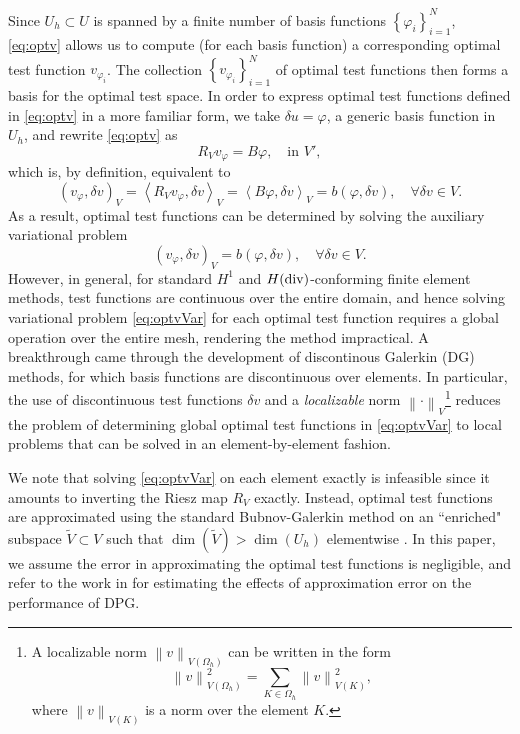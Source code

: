 \documentclass[11pt,onecolumn]{scrartcl}
\newcommand{\eqnlab}[1]{\label{eq:#1}}
\newcommand{\eqnref}[1]{\eqref{eq:#1}}
\newcommand{\nor}[1]{\left\| #1 \right\|}
\newcommand{\LRp}[1]{\left( #1 \right)}
\newcommand{\LRa}[1]{\left\langle #1 \right\rangle}
\newcommand{\LRc}[1]{\left\{ #1 \right\}}
\newcommand{\Oh}{\Omega_h}
\begin{document}
Since $U_h \subset U$ is spanned by a finite number of basis functions $\LRc{\varphi_i}_{i=1}^N$, \eqnref{optv} allows us to compute (for each basis function) a corresponding optimal test function $v_{\varphi_i}$. The collection $\LRc{v_{\varphi_i}}_{i = 1}^N$ of optimal test functions then forms a basis for the optimal test space.  In order to express optimal test functions defined in \eqnref{optv} in a more familiar form, we take  $\delta u = \varphi$, a generic basis function in $U_h$, and rewrite \eqnref{optv} as
\[
R_Vv_{\varphi} = B\varphi, \quad \text{in } V',
\]
which is, by definition, equivalent to
\[
\LRp{v_\varphi,\delta v}_V = \LRa{R_Vv_\varphi,\delta v}_{V}=
\LRa{B\varphi, \delta v}_V = b\LRp{\varphi,\delta v}, \quad
\forall \delta v \in V.
\]
As a result, optimal test functions can be determined by solving the auxiliary
variational problem
\begin{equation}
\eqnlab{optvVar}
\left(v_\varphi,\delta v\right)_V = b(\varphi,\delta v), \quad \forall
\delta v \in V.
\end{equation}
However, in general, for standard $H^1$ and $H({\rm div})$-conforming finite element methods, test functions are continuous over the entire domain, and hence solving variational problem \eqnref{optvVar} for each optimal test function requires a global operation over the entire mesh, rendering the method impractical. A breakthrough came through the development of discontinous Galerkin (DG) methods, for which basis functions are discontinuous over elements. In particular, the use of discontinuous test functions $\delta v$ and a \textit{localizable} norm $\nor{\cdot}_V$\footnote{A localizable norm $\nor{v}_{V(\Oh)}$ can be written in the form 
$$\nor{v}_{V(\Oh)}^2 = \sum_{K\in\Oh} \nor{v}_{V(K)}^2,$$ where $\nor{v}_{V(K)}$ is a norm over the element $K$.} reduces the problem of determining global optimal test functions in \eqnref{optvVar} to local problems that can be solved in an element-by-element fashion.

We note that solving \eqnref{optvVar} on each element exactly is infeasible since it amounts to inverting the Riesz map $R_V$ exactly. Instead, optimal test functions are approximated using the standard Bubnov-Galerkin method on an ``enriched" subspace $\tilde{V} \subset V$ such that $\dim(\tilde{V}) > \dim(U_h)$ elementwise \cite{DPG1, DPG2}. In this paper, we assume the error in approximating the optimal test functions is negligible, and refer to the work in \cite{practicalDPG} for estimating the effects of approximation error on the performance of DPG.
\end{document}
